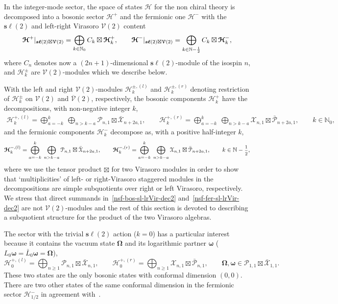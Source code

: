 \documentclass[11pt]{article}
\newcommand{\tensore}{\boxtimes}
\newcommand{\ffrac}[2]{\mbox{\footnotesize$\displaystyle\frac{#1}{#2}$}}
\newcommand{\half}{%
  \mathchoice{\ffrac{1}{2}}{\frac{1}{2}}{\frac{1}{2}}{\frac{1}{2}}}
\newcommand{\vac}{\boldsymbol{\Omega}}
\newcommand{\lvac}{\boldsymbol{\omega}}
\newcommand{\oN}{\mathbb{N}}
\newcommand{\Vir}{\mathcal{V}}
\newcommand{\VirN}{\boldsymbol{\mathcal{V}}}
\newcommand{\nSU}{\boldsymbol{s\ell}}
\newcommand{\SUrep}[1]{C_{#1}}
\newcommand{\bimnch}{\boldsymbol{\mathcal{H}}}
\newcommand{\bimn}{\bimnch^{\pm}}
\newcommand{\bimnl}{\bimnch^{\pm,(l)}}
\newcommand{\bimnr}{\bimnch^{\pm,(r)}}
\newcommand{\bimnbos}{\bimnch^{+}}
\newcommand{\bimnbosl}{\bimnch^{+,(l)}}
\newcommand{\bimnbosr}{\bimnch^{+,(r)}}
\newcommand{\bimnferl}{\bimnch^{-,(l)}}
\newcommand{\bimnferr}{\bimnch^{-,(r)}}
\newcommand{\bimnfer}{\bimnch^{-}}
\newcommand{\VX}{\mathcal{X}}
\newcommand{\VP}{\mathcal{P}}
\theoremstyle{definition}
\begin{document}
In the integer-mode sector, the space of states $\bimnch$ for the non chiral theory  is  decomposed
into a bosonic sector $\bimnbos$ and the fermionic one $\bimnfer$ with
the $\nSU(2)$ and left-right Virasoro $\VirN(2)$ content~\cite{tobepublished}
\begin{equation}\label{nsf-sl-Vir}
\bimnbos|_{\nSU(2)\boxtimes\VirN(2)} =
\bigoplus_{k\in\oN_0}\SUrep{k}\boxtimes \bimnbos_k, \qquad \bimnfer|_{\nSU(2)\boxtimes\VirN(2)} =
\bigoplus_{k\in\oN-\half}\SUrep{k}\boxtimes \bimnfer_k,
\end{equation}
 where $\SUrep{n}$ denotes now a $(2n+1)$-dimensional $\nSU(2)$-module of the
isospin $n$, and  $\bimn_k$ are $\VirN(2)$-modules which we describe
below.

With the left and right $\Vir(2)$-modules $\bimnl_k$ and
$\bimnr_k$ denoting restriction of $\bimn_k$ on $\Vir(2)$ and
$\overline{\Vir}(2)$, respectively, the bosonic components
$\bimnbos_k$ have the decompositions, with non-negative integer $k$,
\begin{eqnarray}
\bimnbosl_k =
\bigoplus_{a=-k}^k\;\bigoplus_{n> k-a}\VP_{n,1}\tensore\bar{\VX}_{n+2a,1},\qquad
\bimnbosr_k =
\bigoplus_{a=-k}^k\;\bigoplus_{n>
  k-a}\VX_{n,1}\tensore\bar{\VP}_{n+2a,1},\qquad k\in\oN_0,\label{nsf-bos-sl-lrVir-dec2}
\end{eqnarray}
and the fermionic components $\bimnfer_k$ decompose as, with a
positive half-integer $k$,
\begin{equation}
\bimnferl_k =
\bigoplus_{a=-k}^k\;\bigoplus_{n>
  k-a}\VP_{n,1}\tensore\bar{\VX}_{n+2a,1},\qquad
\bimnferr_k =
\bigoplus_{a=-k}^k\;\bigoplus_{n>
  k-a}\VX_{n,1}\tensore\bar{\VP}_{n+2a,1},\qquad k\in\oN-\half,\label{nsf-fer-sl-lrVir-dec2}
\end{equation}
where we use the tensor product $\tensore$ for two Virasoro
modules in order to show that `multiplicities'  of left-
or right-Virasoro staggered modules in the decompositions are simple subquotients over right
or left Virasoro, respectively. We stress that direct summands
in~\eqref{nsf-bos-sl-lrVir-dec2} and~\eqref{nsf-fer-sl-lrVir-dec2} are
not $\VirN(2)$-modules and the rest of this section is devoted to
describing a subquotient structure for the product of the two Virasoro algebras.

The sector with the trivial $\nSU(2)$ action ($k=0$) has a particular
interest because it contains the vacuum state $\vac$ and its
logarithmic partner $\lvac$ ($L_0\lvac = \bar{L}_0\lvac = \vac$),
\begin{equation}\label{nsf-vac-lrVir}
\bimnbosl_0 =  \bigoplus_{n\geq
  1}\VP_{n,1}\tensore\bar{\VX}_{n,1},
  \qquad
  \bimnbosr_0 =  \bigoplus_{n\geq
  1}\VX_{n,1}\tensore\bar{\VP}_{n,1}, \qquad\vac,\lvac\in\VP_{1,1}\tensore\bar{\VX}_{1,1}.
\end{equation}
These two states are the only bosonic states with conformal dimension
$(0,0)$. There are two other states of the same conformal dimension in
the fermionic sector $\bimnfer_{1/2}$ in agreement with~\cite{GK}.
\end{document}
